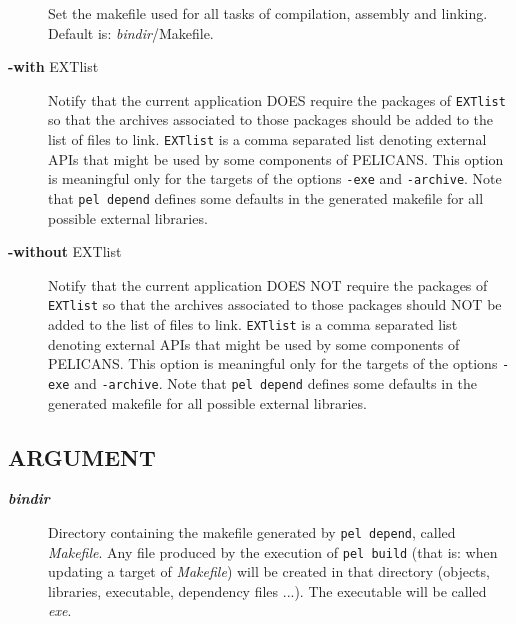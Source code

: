 \documentclass{article}
\begin{document}
\begin{description}
Set the makefile used for all tasks of compilation,
assembly and linking. Default is: \emph{bindir}/Makefile.


\item[\textbf{-with} EXTlist] \mbox{}

Notify that the current application DOES require the
packages of \texttt{EXTlist} so that the archives
associated to those packages
should be added to the list of files to link.
\texttt{EXTlist} is a comma separated list denoting external APIs
that might be used by some components of PELICANS.
This option is meaningful only for the targets
of the options \texttt{-exe} and \texttt{-archive}.
Note that \texttt{pel depend} defines some defaults in the
generated makefile for all possible external libraries.


\item[\textbf{-without} EXTlist] \mbox{}

Notify that the current application DOES NOT require the
packages of \texttt{EXTlist} so that the archives
associated to those packages
should NOT be added to the list of files to link.
\texttt{EXTlist} is a comma separated list denoting external APIs
that might be used by some components of PELICANS.
This option is meaningful only for the targets
of the options \texttt{-exe} and \texttt{-archive}.
Note that \texttt{pel depend} defines some defaults in the
generated makefile for all possible external libraries.

\end{description}
\subsection*{ARGUMENT\label{build_ARGUMENT}}
\begin{description}

\item[\textbf{ \emph{bindir} }] \mbox{}

Directory containing the makefile generated by \texttt{pel depend},
called \emph{Makefile}. Any file produced by the execution
of \texttt{pel build} (that is: when updating a target of \emph{Makefile})
will be created in that directory (objects, libraries, executable,
dependency files ...). The executable will be called \emph{exe}.

\end{description}
\end{document}
